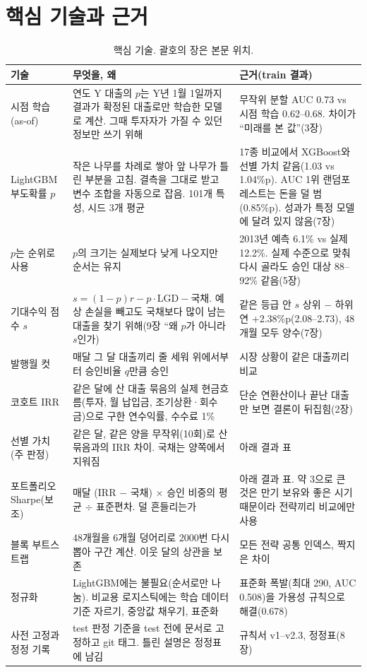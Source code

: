 \section*{핵심 기술과 근거}
\begin{table}[H]\centering\small
\begin{tabularx}{\linewidth}{@{}>{\raggedright\arraybackslash}p{30mm}>{\raggedright\arraybackslash}p{50mm}L@{}}\toprule
기술 & 무엇을, 왜 & 근거(train 결과)\\\midrule
시점 학습(as-of) & 연도 Y 대출의 $p$는 Y년 1월 1일까지 결과가 확정된 대출로만 학습한 모델로 계산. 그때 투자자가 가질 수 있던 정보만 쓰기 위해 & 무작위 분할 AUC 0.73 vs 시점 학습 0.62--0.68. 차이가 ``미래를 본 값''(3장)\\
LightGBM 부도확률 $p$ & 작은 나무를 차례로 쌓아 앞 나무가 틀린 부분을 고침. 결측을 그대로 받고 변수 조합을 자동으로 잡음. 101개 특성, 시드 3개 평균 & 17종 비교에서 XGBoost와 선별 가치 같음(1.03 vs 1.04\%p). AUC 1위 랜덤포레스트는 돈을 덜 범(0.85\%p). 성과가 특정 모델에 달려 있지 않음(7장)\\
$p$는 순위로 사용 & $p$의 크기는 실제보다 낮게 나오지만 순서는 유지 & 2013년 예측 6.1\% vs 실제 12.2\%. 실제 수준으로 맞춰 다시 골라도 승인 대상 88--92\% 같음(5장)\\
기대수익 점수 $s$ & $s=(1-p)r-p\cdot\mathrm{LGD}-$국채. 예상 손실을 빼고도 국채보다 많이 남는 대출을 찾기 위해(9장 ``왜 $p$가 아니라 $s$인가) & 같은 등급 안 $s$ 상위 $-$ 하위 연 +2.38\%p(2.08--2.73), 48개월 모두 양수(7장)\\
발행월 컷 & 매달 그 달 대출끼리 줄 세워 위에서부터 승인비율 $q$만큼 승인 & 시장 상황이 같은 대출끼리 비교\\
코호트 IRR & 같은 달에 산 대출 묶음의 실제 현금흐름(투자, 월 납입금, 조기상환·\allowbreak{}회수금)으로 구한 연수익률, 수수료 1\% & 단순 연환산이나 끝난 대출만 보면 결론이 뒤집힘(2장)\\
선별 가치(주 판정) & 같은 달, 같은 양을 무작위(10회)로 산 묶음과의 IRR 차이. 국채는 양쪽에서 지워짐 & 아래 결과 표\\
포트폴리오 Sharpe(보조) & 매달 (IRR $-$ 국채) \ensuremath{\times} 승인 비중의 평균 \ensuremath{\div} 표준편차. 덜 흔들리는가 & 아래 결과 표. 약 3으로 큰 것은 만기 보유와 좋은 시기 때문이라 전략끼리 비교에만 사용\\
블록 부트스트랩 & 48개월을 6개월 덩어리로 2000번 다시 뽑아 구간 계산. 이웃 달의 상관을 보존 & 모든 전략 공통 인덱스, 짝지은 차이\\
정규화 & LightGBM에는 불필요(순서로만 나눔). 비교용 로지스틱에는 학습 데이터 기준 자르기, 중앙값 채우기, 표준화 & 표준화 폭발(최대 290, AUC 0.508)을 가용성 규칙으로 해결(0.678)\\
사전 고정과 정정 기록 & test 판정 기준을 test 전에 문서로 고정하고 git 태그. 틀린 설명은 정정표에 남김 & 규칙서 v1--v2.3, 정정표(8장)\\\bottomrule
\end{tabularx}
\caption{핵심 기술. 괄호의 장은 본문 위치.}
\end{table}

